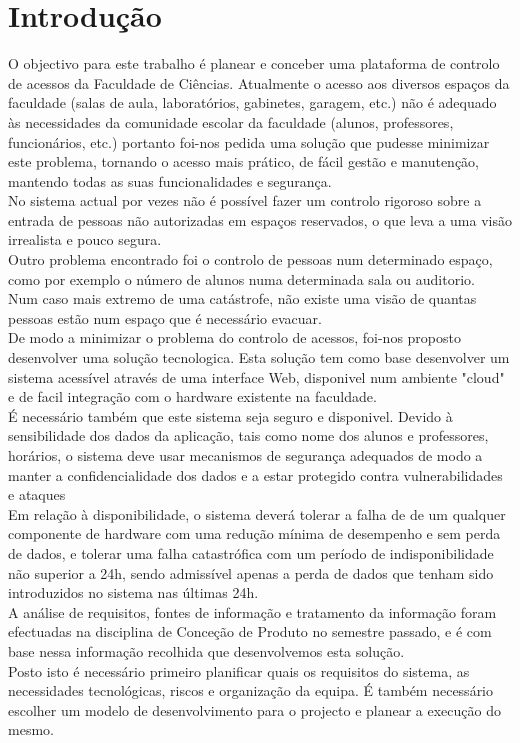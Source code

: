 \documentclass[a4paper]{report}
\begin{document}
\chapter{Introdução}
O objectivo para este trabalho é planear e conceber uma plataforma de controlo de acessos da Faculdade de Ciências. 
Atualmente o acesso aos diversos espaços da faculdade (salas de aula, laboratórios, gabinetes, garagem, etc.) não é adequado às necessidades da comunidade escolar da faculdade (alunos, professores, funcionários, etc.) portanto foi-nos pedida uma solução que pudesse minimizar este problema, tornando o acesso mais prático, de fácil gestão e manutenção, mantendo todas as suas funcionalidades e segurança.\\
No sistema actual por vezes não é possível fazer um controlo rigoroso sobre a entrada de pessoas não autorizadas em espaços reservados, o que leva a uma visão irrealista e pouco segura.\\
Outro problema encontrado foi o controlo de pessoas num determinado espaço, como por exemplo o número de alunos numa determinada sala ou auditorio.\\
Num caso mais extremo de uma catástrofe, não existe uma visão de quantas pessoas estão num espaço que é necessário evacuar.\\
De modo a minimizar o problema do controlo de acessos, foi-nos proposto desenvolver uma solução tecnologica.
Esta solução tem como base desenvolver um sistema acessível através de uma interface Web, disponivel num ambiente "cloud" e de facil integração com o hardware existente na faculdade.\\
É necessário também que este sistema seja seguro e disponivel. Devido à sensibilidade dos dados da aplicação, tais como nome dos alunos e professores, horários, o sistema deve usar mecanismos de segurança adequados de modo a manter a confidencialidade dos dados e a estar protegido contra vulnerabilidades e ataques\\
Em relação à disponibilidade, o sistema deverá tolerar a falha de de um qualquer componente de hardware com uma redução mínima de desempenho e sem perda de dados, e tolerar uma falha catastrófica com um período de indisponibilidade não superior a 24h, sendo admissível apenas a perda de dados que tenham sido introduzidos no sistema nas últimas 24h.\\
A análise de requisitos, fontes de informação e tratamento da informação foram efectuadas na disciplina de Conceção de Produto no semestre passado, e é com base nessa informação recolhida que desenvolvemos esta solução.\\
Posto isto é necessário primeiro planificar quais os requisitos do sistema, as necessidades tecnológicas, riscos e organização da equipa. É também necessário escolher um modelo de desenvolvimento para o projecto e planear a execução do mesmo.\\
\end{document}
